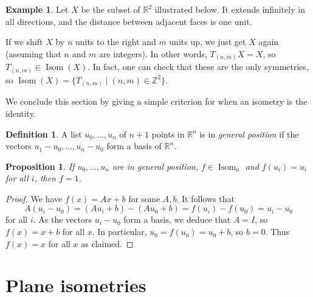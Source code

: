 \documentclass{amsart}
\DeclareMathOperator{\Isom}     {Isom}
\newcommand{\Z}         {{\mathbb{Z}}}
\newcommand{\R}         {{\mathbb{R}}}
\newcommand{\st}        {\;|\;}
\renewcommand{\:}{\colon}
\newtheorem{proposition}[theorem]{Proposition}
\theoremstyle{definition}
\newtheorem{definition}[theorem]{Definition}
\newtheorem{example}[theorem]{Example}
\begin{document}
\begin{example}\label{eg-p-one}
 Let $X$ be the subset of $\R^2$ illustrated below.  It extends
 infinitely in all directions, and the distance between adjacent faces
 is one unit.  
 \begin{center}
 \end{center}
 If we shift $X$ by $n$ units to the right and $m$ units up, we just
 get $X$ again (assuming that $n$ and $m$ are integers).  In other
 words, $T_{(n,m)}X=X$, so $T_{(n,m)}\in \Isom(X)$.  In fact, one can
 check that these are the only symmetries, so
 $\Isom(X)=\{T_{(n,m)}\st(n,m)\in\Z^2\}$. 
\end{example}


We conclude this section by giving a simple criterion for when an
isometry is the identity.
\begin{definition}
 A list $u_0,\ldots,u_n$ of $n+1$ points in $\R^n$ is in \emph{general
 position} if the vectors $u_1-u_0,\ldots,u_n-u_0$ form a basis of
 $\R^n$.
\end{definition}

\begin{proposition}\label{prop-gen-pos}
 If $u_0,\ldots,u_n$ are in general position, $f\in \Isom_n$ and
 $f(u_i)=u_i$ for all $i$, then $f=1$.
\end{proposition}
\begin{proof}
 We have $f(x)=Ax+b$ for some $A,b$.  It follows that
 \[ A(u_i-u_0) = (Au_i+b)-(Au_0+b) = f(u_i)-f(u_0) = u_i-u_0 \]
 for all $i$.  As the vectors $u_i-u_0$ form a basis, we deduce that
 $A=I$, so $f(x)=x+b$ for all $x$.  In particular, $u_0=f(u_0)=u_0+b$,
 so $b=0$.  Thus $f(x)=x$ for all $x$ as claimed.
\end{proof}


\section{Plane isometries}
\end{document}
